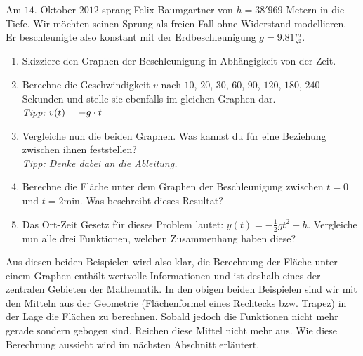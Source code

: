 \documentclass[11pt,oneside]{article}
\begin{document}
	\begin{aufgabe}
		Am $14$. Oktober $2012$ sprang Felix Baumgartner von $h=38'969$ Metern in die Tiefe. Wir möchten seinen Sprung als freien Fall ohne Widerstand modellieren. Er beschleunigte also konstant mit der Erdbeschleunigung $g=9.81\frac{m}{s^2}$.\vspace{5pt}\\
		\begin{minipage}{0.55\linewidth}
			\begin{enumerate}[label=\alph*)]
				\item Skizziere den Graphen der Beschleunigung in Abhängigkeit von der Zeit.
				\item Berechne die Geschwindigkeit $v$ nach $10$, $20$, $30$, $60$, $90$, $120$, $180$, $240$ Sekunden und stelle sie ebenfalls im gleichen Graphen dar.\\ \textit{Tipp:} $v(t)=-g\cdot t$
				\item Vergleiche nun die beiden Graphen. Was kannst du für eine Beziehung zwischen ihnen feststellen? \\\textit{Tipp: Denke dabei an die Ableitung.}
				\item Berechne die Fläche unter dem Graphen der Beschleunigung zwischen $t=0$ und $t=2$min. Was beschreibt dieses Resultat?
				\item Das Ort-Zeit Gesetz für dieses Problem lautet: $y(t)=-\frac{1}{2}gt^2+h$. Vergleiche nun alle drei Funktionen, welchen Zusammenhang haben diese?
			\end{enumerate}
		\end{minipage}
		\hfill
		\begin{minipage}{0.407\linewidth}
		\end{minipage}
	\end{aufgabe}
	Aus diesen beiden Beispielen wird also klar, die Berechnung der Fläche unter einem Graphen enthält wertvolle Informationen und ist deshalb eines der zentralen Gebieten der Mathematik. In den obigen beiden Beispielen sind wir mit den Mitteln aus der Geometrie (Flächenformel eines Rechtecks bzw. Trapez) in der Lage die Flächen zu berechnen. Sobald jedoch die Funktionen nicht mehr gerade sondern gebogen sind. Reichen diese Mittel nicht mehr aus. Wie diese Berechnung aussieht wird im nächsten Abschnitt erläutert.
	\newpage
\end{document}
